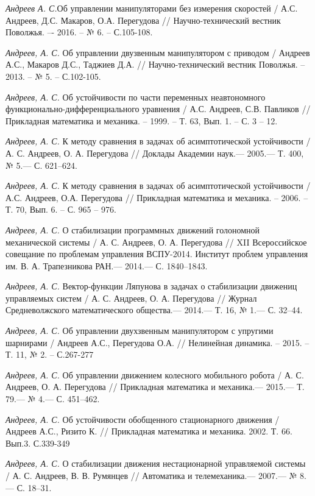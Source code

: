 \begin{thebibliography}{10}
	{\it Андреев А. С.}Об управлении манипуляторами без измерения скоростей / А.С. Андреев, Д.С. Макаров, О.А. Перегудова // Научно-технический 		вестник Поволжья. –- 2016. – № 6. – С.105-108. 

	{\it Андреев, А. С.} Об управлении двузвенным манипулятором с приводом / Андреев А.С., Макаров Д.С., Таджиев Д.А. // Научно-технический вестник 	Поволжья. – 2013. – № 5. – С.102-105.

	{\it Андреев, А. С.} Об устойчивости по части переменных неавтономного функционально-дифференциального уравнения / А.С. Андреев, С.В. 			Павликов // Прикладная математика и механика. – 1999. – Т. 63, Вып. 1. – С. 3 – 12.
	
	{\it Андреев, А. С.} К методу сравнения в задачах об асимптотической устойчивости /
	А. С. Андреев, О. А. Перегудова // Доклады Академии наук.— 2005.— Т. 400, № 5.—
	С. 621–624.
	
	{\it Андреев, А. С.} К методу сравнения в задачах об асимптотической устойчивости / А.С. Андреев, О.А. Перегудова // Прикладная математика и 		механика. – 2006. – Т. 70, Вып. 	6. – С. 965 – 976.

	{\it Андреев, А. С.} О стабилизации программных движений голономной механической системы /
	А. С. Андреев, О. А. Перегудова // XII Всероссийское совещание по проблемам управления ВСПУ-2014. Институт проблем управления им. В. А. 			Трапезникова РАН.— 2014.— С. 1840–1843.

	{\it Андреев, А. С.} Вектор-функции Ляпунова в задачах о стабилизации движениц управляемых систем /
	А. С. Андреев, О. А. Перегудова // Журнал Средневолжского математического общества.— 2014.— Т. 16, № 1.—
	С. 32–44.

	{\it Андреев, А. С.} Об управлении двухзвенным манипулятором с упругими шарнирами / Андреев А.С., Перегудова О.А. // Нелинейная динамика. – 		2015. – Т. 11, № 2. – С.267-277

	{\it Андреев, А. С.} Об управлении движением колесного мобильного робота /
	А. С. Андреев, О. А. Перегудова // Прикладная математика и механика.— 2015.— Т. 79.— № 4.— С. 451–462.

	{\it Андреев, А. С.} Об устойчивости обобщенного стационарного движения / Андреев А.С., Ризито К. // Прикладная математика и механика. 2002. Т.		66. Вып.3. С.339-349 

	{\it Андреев, А. С.} О стабилизации движения нестационарной управляемой системы /
	А. С. Андреев, В. В. Румянцев // Автоматика и телемеханика.— 2007.— № 8.—
	С. 18–31.
	

\end{thebibliography}
